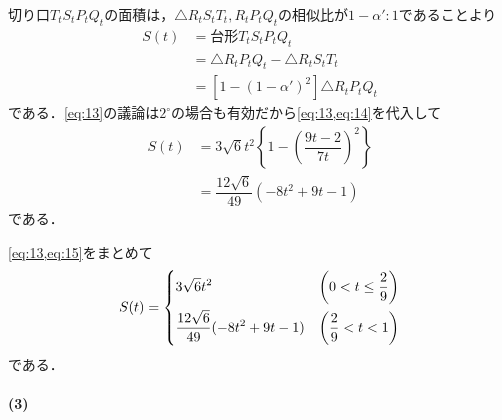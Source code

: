 \documentclass[../../main.tex]{subfiles}
\begin{document}
切り口$T_tS_tP_tQ_t$の面積は，$\triangle R_tS_tT_t, R_tP_tQ_t$の相似比が$1-\alpha':1$であることより
\begin{align}
  S(t)
  &= \text{台形} T_tS_tP_tQ_t \\
  &= \triangle R_tP_tQ_t - \triangle R_tS_tT_t \\
  &= \left[1-(1-\alpha')^2\right] \triangle R_tP_tQ_t
\end{align}
である．\cref{eq:13}の議論は$2^{\circ}$の場合も有効だから\cref{eq:13,eq:14}を代入して
\begin{align}
  S(t)
  &= 3\sqrt{6}t^2 \left\{ 1 - \left( \dfrac{9t-2}{7t} \right)^2 \right\} \\
  &= \dfrac{12\sqrt{6}}{49}(-8t^2+9t-1) \label{eq:15}
\end{align}
である．
\casesend

\cref{eq:13,eq:15}をまとめて
\begin{align}
  S(t) =
  \begin{dcases}
    3\sqrt{6}t^2 & \left(0 < t \le \dfrac{2}{9}\right) \\
    \dfrac{12\sqrt{6}}{49}(-8t^2+9t-1) & \left(\dfrac{2}{9} < t < 1\right)
  \end{dcases} \label{eq:16}
\end{align}
である．

\paragraph{(3)}
\end{document}

